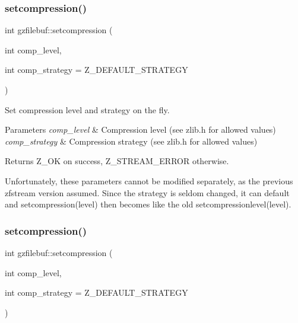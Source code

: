 \subsubsection{\texorpdfstring{setcompression()}{setcompression()}\hspace{0.1cm}{\footnotesize\ttfamily [1/2]}}
{\footnotesize\ttfamily int gzfilebuf\+::setcompression (\begin{DoxyParamCaption}\item[{int}]{comp\+\_\+level,  }\item[{int}]{comp\+\_\+strategy = {\ttfamily Z\+\_\+DEFAULT\+\_\+STRATEGY} }\end{DoxyParamCaption})}



Set compression level and strategy on the fly. 


\begin{DoxyParams}{Parameters}
{\em comp\+\_\+level} & Compression level (see zlib.\+h for allowed values) \\
\hline
{\em comp\+\_\+strategy} & Compression strategy (see zlib.\+h for allowed values) \\
\hline
\end{DoxyParams}
\begin{DoxyReturn}{Returns}
Z\+\_\+\+OK on success, Z\+\_\+\+S\+T\+R\+E\+A\+M\+\_\+\+E\+R\+R\+OR otherwise.
\end{DoxyReturn}
Unfortunately, these parameters cannot be modified separately, as the previous zfstream version assumed. Since the strategy is seldom changed, it can default and setcompression(level) then becomes like the old setcompressionlevel(level). \mbox{\label{classgzfilebuf_ad109ea4fc4ca7cc19d8014b53375255d}} 
\subsubsection{\texorpdfstring{setcompression()}{setcompression()}\hspace{0.1cm}{\footnotesize\ttfamily [2/2]}}
{\footnotesize\ttfamily int gzfilebuf\+::setcompression (\begin{DoxyParamCaption}\item[{int}]{comp\+\_\+level,  }\item[{int}]{comp\+\_\+strategy = {\ttfamily Z\+\_\+DEFAULT\+\_\+STRATEGY} }\end{DoxyParamCaption})}



